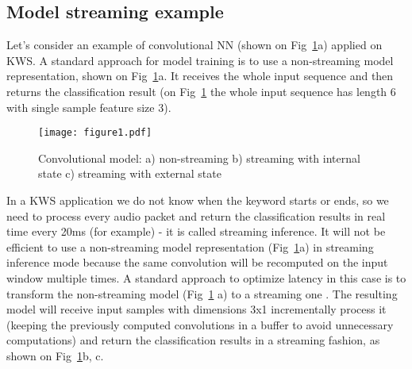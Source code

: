 \documentclass[a4paper]{article}
\begin{document}
\subsection{Model streaming example}

Let’s consider an example of convolutional NN (shown on Fig~\ref{fig:streaming_convolution}a) applied on KWS. A standard approach for model training is to use a non-streaming model representation, shown on Fig~\ref{fig:streaming_convolution}a. It receives the whole input sequence and then returns the classification result (on Fig~\ref{fig:streaming_convolution} the whole input sequence has length 6 with single sample feature size 3).

\begin{figure}[t]
  \centering
  \texttt{[image: figure1.pdf]}
  \caption{Convolutional model: a) non-streaming b) streaming with internal state c) streaming with external state}
  \label{fig:streaming_convolution}
  \vspace{-5mm} \end{figure}

In a KWS application we do not know when the keyword starts or ends, so we need to process every audio packet and return the classification results in real time every 20ms (for example) - it is called streaming inference. It will not be efficient to use a non-streaming model representation (Fig~\ref{fig:streaming_convolution}a) in streaming inference mode because the same convolution will be recomputed on the input window multiple times. A standard approach to optimize latency in this case is to transform the non-streaming model (Fig~\ref{fig:streaming_convolution} a) to a streaming one \cite{STREAM_CONV}. The resulting model will receive input samples with dimensions 3x1 incrementally process it (keeping the previously computed convolutions in a buffer to avoid unnecessary computations) and return the classification results in a streaming fashion, as shown on Fig~\ref{fig:streaming_convolution}b, c.
\end{document}
